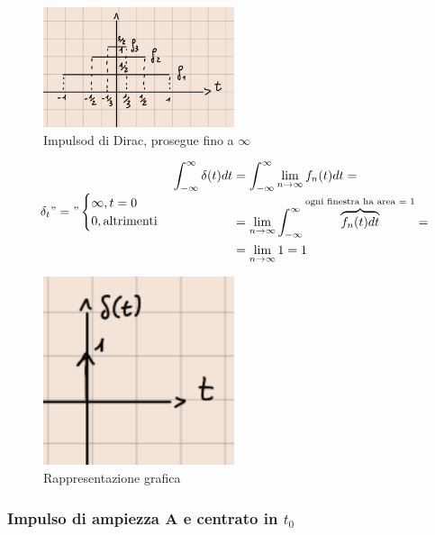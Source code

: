 \documentclass[a4paper, 12pt]{book}
\theoremstyle{plain}
\begin{document}
\begin{figure}
    \includegraphics[width=0.5\textwidth]{dirac.png}
    \caption{Impulsod di Dirac, prosegue fino a $\infty$}
\end{figure}

\[
    \delta_t "=" \begin{cases}
        \infty, t = 0\\
        0, \textrm{altrimenti}
    \end{cases}
    \begin{split}
        \int_{-\infty}^\infty \delta(t) dt &= \int_{-\infty}^\infty \lim_{n \rightarrow \infty} f_n(t) dt = \\
        &= \lim_{n \rightarrow \infty} \int_{-\infty}^\infty \overbrace{f_n (t) dt}^{\textrm{ogni finestra ha area = 1}} = \\
        &= \lim_{n \rightarrow \infty} 1 = 1
    \end{split}
\]

\begin{figure}
    \includegraphics[width=0.5\textwidth]{frecciasu.png}
    \caption{Rappresentazione grafica}
\end{figure}

\subsubsection{Impulso di ampiezza A e centrato in $t_0$}
\end{document}
